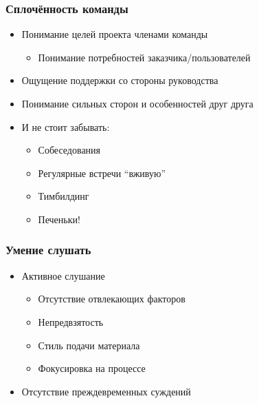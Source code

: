 \documentclass{../../slides-style}
\begin{document}
    \begin{frame}
        \frametitle{Сплочённость команды}
        \begin{itemize}
            \item Понимание целей проекта членами команды
            \begin{itemize}
                \item Понимание потребностей заказчика/пользователей
            \end{itemize}
            \item Ощущение поддержки со стороны руководства
            \item Понимание сильных сторон и особенностей друг друга
            \item И не стоит забывать:
            \begin{itemize}
                \item Собеседования
                \item Регулярные встречи “вживую”
                \item Тимбилдинг
                \item Печеньки!
            \end{itemize}
        \end{itemize}
    \end{frame}

    \begin{frame}
        \frametitle{Умение слушать}
        \begin{itemize}
            \item Активное слушание
            \begin{itemize}
                \item Отсутствие отвлекающих факторов
                \item Непредвзятость
                \item Стиль подачи материала
                \item Фокусировка на процессе
            \end{itemize}
            \item Отсутствие преждевременных суждений
        \end{itemize}
    \end{frame}
\end{document}
